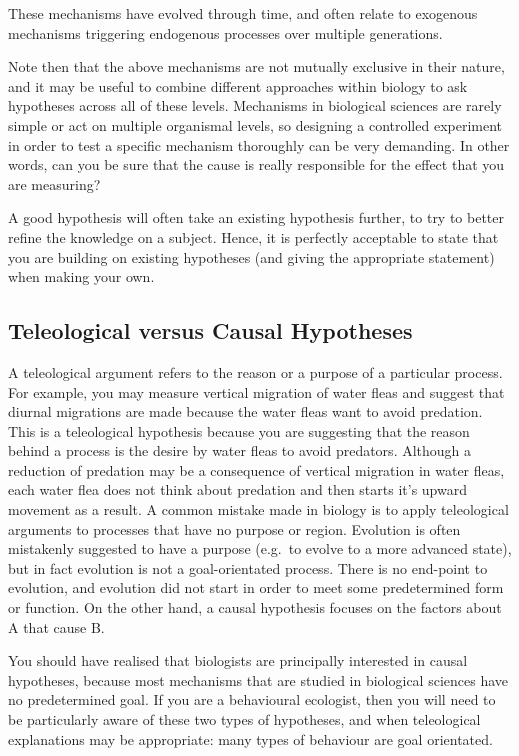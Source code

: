 \documentclass[
]{krantz}
\begin{document}
These mechanisms have evolved through time, and often relate to exogenous mechanisms triggering endogenous processes over multiple generations.

Note then that the above mechanisms are not mutually exclusive in their nature, and it may be useful to combine different approaches within biology to ask hypotheses across all of these levels. Mechanisms in biological sciences are rarely simple or act on multiple organismal levels, so designing a controlled experiment in order to test a specific mechanism thoroughly can be very demanding. In other words, can you be sure that the cause is really responsible for the effect that you are measuring?

A good hypothesis will often take an existing hypothesis further, to try to better refine the knowledge on a subject. Hence, it is perfectly acceptable to state that you are building on existing hypotheses (and giving the appropriate statement) when making your own.

\hypertarget{teleological-versus-causal-hypotheses}{%
\subsection{Teleological versus Causal Hypotheses}\label{teleological-versus-causal-hypotheses}}

A teleological argument refers to the reason or a purpose of a particular process. For example, you may measure vertical migration of water fleas and suggest that diurnal migrations are made because the water fleas want to avoid predation. This is a teleological hypothesis because you are suggesting that the reason behind a process is the desire by water fleas to avoid predators. Although a reduction of predation may be a consequence of vertical migration in water fleas, each water flea does not think about predation and then starts it's upward movement as a result. A common mistake made in biology is to apply teleological arguments to processes that have no purpose or region. Evolution is often mistakenly suggested to have a purpose (e.g.~to evolve to a more advanced state), but in fact evolution is not a goal-orientated process. There is no end-point to evolution, and evolution did not start in order to meet some predetermined form or function. On the other hand, a causal hypothesis focuses on the factors about A that cause B.

You should have realised that biologists are principally interested in causal hypotheses, because most mechanisms that are studied in biological sciences have no predetermined goal. If you are a behavioural ecologist, then you will need to be particularly aware of these two types of hypotheses, and when teleological explanations may be appropriate: many types of behaviour are goal orientated.
\end{document}

